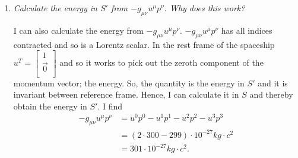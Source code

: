 \begin{example}
\begin{enumerate}
\begin{equation}
\begin{split}
\begin{bmatrix}
					0\\
					\cos(\theta_2)+\sqrt{2}\sin(\theta_2)\\
				\end{bmatrix}\\
				&=\begin{bmatrix}
					|\vec{v}|\\
					0\\
					0\\
				\end{bmatrix}.\\
			\end{split}
		\end{equation} 
		In order for the third component of the transformed velocity to vanish; $\cos(\theta_2)+\sqrt{2}\sin(\theta_2)=0\Rightarrow \theta_2=-35.264 deg$. By using the two rotation angles I can now transform $p$ and find it in $S'$
		\begin{equation}
			p'=\Lambda_{tot}p=\begin{bmatrix}
				301 \\
				296/3\\
				-601/3\\
				-601/3\\
			\end{bmatrix}\cdot 10^{-27}kg.
		\end{equation} 
		Hence, the energy (now in SI units) as seen from $S'$ is $301\cdot 10^{-27}kg\cdot c^2\simeq 2.7\cdot 10^{-8}J$.
		
		\item \emph{Calculate the energy in $S'$ from $-g_{\mu\nu}u^\mu p^\nu$. Why does this work?}
		
		I can also calculate the energy from $-g_{\mu\nu}u^\mu p^\nu$. $-g_{\mu\nu}u^\mu p^\nu$ has all indices contracted and so is a Lorentz scalar. In the rest frame of the spaceship $u^T=\begin{bmatrix}
			1 \\\vec{0}\\
		\end{bmatrix}$ and so it works to pick out the zeroth component of the momentum vector; the energy. So, the quantity is the energy in $S'$ and it is invariant between reference frame. Hence, I can calculate it in $S$ and thereby obtain the energy in $S'$. I find
		\begin{equation}
			\begin{split}
				-g_{\mu\nu}u^\mu p^\nu&=u^0p^0-u^1p^1-u^2p^2-u^3p^3\\
				&=(2\cdot 300-299)\cdot 10^{-27}kg\cdot c^2\\
				&=301\cdot 10^{-27}kg\cdot c^2.
			\end{split}
		\end{equation} 
	\end{enumerate}
\end{example}

